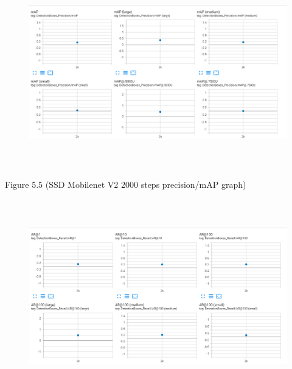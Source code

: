 \documentclass[12pt]{report}
\renewcommand{\_}{\kern-1.5pt\textunderscore\kern-1.5pt}
\begin{document}

\begin{figure}[H]
	\begin{Center}
		\includegraphics[width=6.27in,height=3.25in]{./media/image11.png}
	\end{Center}
\end{figure}



\par

\begin{FlushRight}
Figure 5.5 (SSD Mobilenet V2 2000 steps precision/mAP graph)
\end{FlushRight}\par


\vspace{\baselineskip}



\begin{figure}[H]
	\begin{Center}
		\includegraphics[width=6.27in,height=3.31in]{./media/image8.png}
	\end{Center}
\end{figure}
\end{document}
